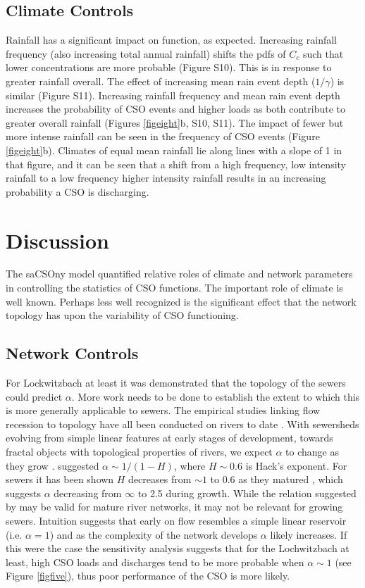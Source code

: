 \documentclass{agujournal2018}
\begin{document}
 \subsection{Climate Controls}
Rainfall has a signif\/icant impact on function, as expected. Increasing rainfall frequency (also increasing total annual rainfall) shifts the pdfs of $C_c$ such that lower concentrations are more probable (Figure S10). This is in response to greater rainfall overall. The ef\/fect of increasing mean rain event depth ($1/\gamma$) is similar (Figure S11). Increasing rainfall frequency and mean rain event depth increases the probability of CSO events and higher loads as both contribute to greater overall rainfall (Figures \ref{figeight}b, S10, S11). The impact of fewer but more intense rainfall can be seen in the frequency of CSO events (Figure \ref{figeight}b). Climates of equal mean rainfall lie along lines with a slope of 1 in that f\/igure, and it can be seen that a shift from a high frequency, low intensity rainfall to a low frequency higher intensity rainfall results in an increasing probability a CSO is discharging.


\section{Discussion}
The saCSOny model quantif\/ied relative roles of climate and network parameters in controlling the statistics of CSO functions. The important role of climate is well known. Perhaps less well recognized is the signif\/icant ef\/fect that the network topology has upon the variability of CSO functioning.

\subsection{Network Controls}
For Lockwitzbach at least it was demonstrated that the topology of the sewers could predict $\alpha$. More work needs to be done to establish the extent to which this is more generally applicable to sewers. The empirical studies linking f\/low recession to topology have all been conducted on rivers to date \citep{Biswal_2014}. With sewersheds evolving from simple linear features at early stages of development, towards fractal objects with topological properties of rivers, we expect $\alpha$ to change as they grow \citep{Yang_2017}. \citet{Biswal_2014} suggested $\alpha \sim 1/(1-H)$, where $H \sim 0.6$ is Hack’s exponent. For sewers it has been shown $H$ decreases from $\sim 1$ to 0.6 as they matured \citep{Yang_2017}, which suggests $\alpha$ decreasing from $\infty$ to 2.5 during growth. While the relation suggested by \citet{Biswal_2010} may be valid for mature river networks, it may not be relevant for growing sewers. Intuition suggests that early on f\/low resembles a simple linear reservoir (i.e. $\alpha = 1$) and as the complexity of the network develops $\alpha$ likely increases. If this were the case the sensitivity analysis suggests that for the Lochwitzbach at least, high CSO loads and discharges tend to be more probable when $\alpha \sim 1$ (see Figure \ref{figfive}), thus poor performance of the CSO is more likely. 
\end{document}
